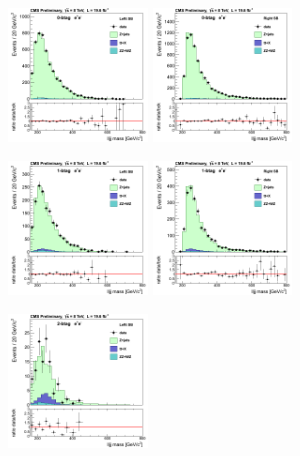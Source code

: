 \begin{figure}[htb]
\centerline{
\includegraphics[width=0.33\textwidth]{plots/approvalxchecks/Left_0b_eelin.png}
\includegraphics[width=0.33\textwidth]{plots/approvalxchecks/Right_0b_eelin.png}
}
\centerline{
\includegraphics[width=0.33\textwidth]{plots/approvalxchecks/Left_1b_eelin.png}
\includegraphics[width=0.33\textwidth]{plots/approvalxchecks/Right_1b_eelin.png}
}
\centerline{
\includegraphics[width=0.33\textwidth]{plots/approvalxchecks/Left_2b_eelin.png}
}
\end{figure}
